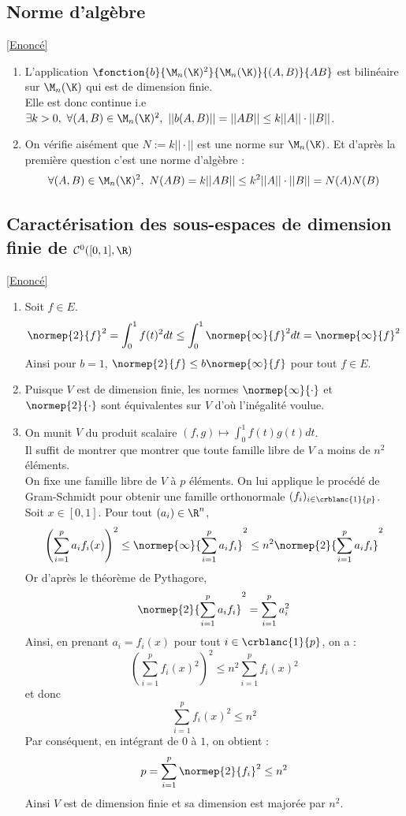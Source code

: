 \documentclass{book}
\begin{document}
	\subsection{Norme d'algèbre }
	\label{Norme d'algèbre corrigé}
	\textcolor{blue}{\hyperref[Norme d'algèbre]{[Enoncé]}}\\
	\begin{enumerate}[leftmargin=*]
		\item L'application $\fonction{b}{\M_n(\K)^2}{\M_n(\K)}{(A,B)}{AB}$ est bilinéaire sur $\M_n(\K)$ qui est de dimension finie.\\
		Elle est donc continue i.e $\exists k>0,\ \forall (A,B)\in \M_n(\K)^2,\ ||b(A,B)||=||AB||\leq k||A||\cdot||B||$.
		\item On vérifie aisément que $N:=k||\cdot||$ est une norme sur $\M_n(\K)$. Et d'après la première question c'est une norme d'algèbre :
		$$\forall (A,B)\in \M_n(\K)^2,\ N(AB)=k||AB||\leq k^2||A||\cdot||B||=N(A)N(B)$$
	\end{enumerate}
	
	\subsection{Caractérisation des sous-espaces de dimension finie de $\mathcal C^0([0,1],\R)$ }
	\label{Caractérisation des sous-espaces de dimension finie de C0 corrigé}
	\textcolor{blue}{\hyperref[Caractérisation des sous-espaces de dimension finie de C0]{[Enoncé]}}\\
	\begin{enumerate}
		\item Soit $f\in E$.
		\[\normep{2}{f}^2=\int_0^1f(t)^2dt\leq \int_0^1\normep{\infty}{f}^2dt=\normep{\infty}{f}^2\]
		Ainsi pour $b=1$, $\normep{2}{f}\leq b\normep{\infty}{f}$ pour tout $f\in E$.
		\item Puisque $V$ est de dimension finie, les normes $\normep{\infty}{\cdot}$ et $\normep{2}{\cdot}$ sont équivalentes sur $V$ d'où l'inégalité voulue.
		\item On munit $V$ du produit scalaire $(f,g)\mapsto\displaystyle\int_0^1f(t)g(t)dt$.\\
		Il suffit de montrer que montrer que toute famille libre de $V$ a moins de $n^2$ éléments.\\
		On fixe une famille libre de $V$ à $p$ éléments. On lui applique le procédé de Gram-Schmidt pour obtenir une famille orthonormale $(f_i)_{i\in\crblanc{1}{p}}$.\\
		Soit $x\in[0,1]$. Pour tout $(a_i)\in\R^n$, \[\left(\sum_{i=1}^pa_if_i(x)\right)^2\leq\normep{\infty}{\sum_{i=1}^pa_if_i}^2\leq n^2\normep{2}{\sum_{i=1}^pa_if_i}^2\]
		Or d'après le théorème de Pythagore, \[\normep{2}{\sum_{i=1}^pa_if_i}^2=\sum_{i=1}^pa_i^2\]
		Ainsi, en prenant $a_i=f_i(x)$ pour tout $i\in\crblanc{1}{p}$, on a :
		\[\left(\sum_{i=1}^pf_i(x)^2\right)^2\leq n^2\sum_{i=1}^pf_i(x)^2\]
		et donc
		\[\sum_{i=1}^pf_i(x)^2\leq n^2\]
		Par conséquent, en intégrant de $0$ à $1$, on obtient :
		\[p=\sum_{i=1}^p\normep{2}{f_i}^2\leq n^2\]
		Ainsi $V$ est de dimension finie et sa dimension est majorée par $n^2$.
	\end{enumerate}
	
\end{document}
